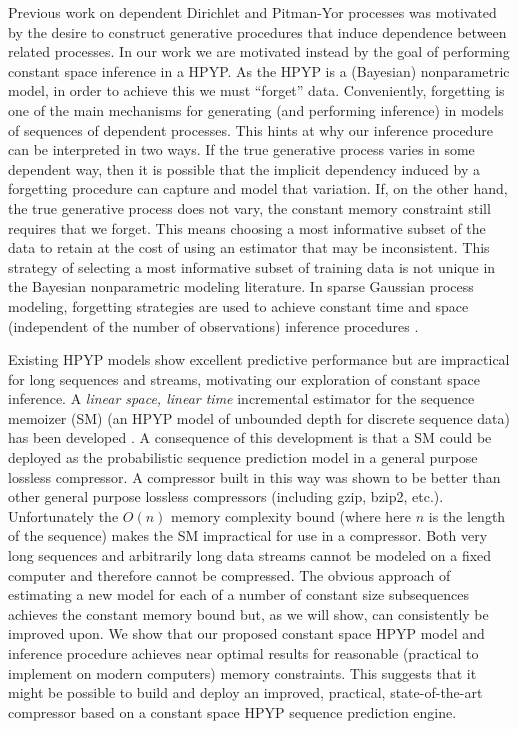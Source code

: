 Previous work on dependent Dirichlet and Pitman-Yor processes \cite{MacEachern2000, Srebro2005, Griffin2006, Caron2007, Caron2007a} was motivated by the desire to construct generative procedures that induce dependence between related processes.  In our work we are motivated instead by the goal of performing constant space inference in a HPYP.  As the HPYP is a (Bayesian) nonparametric model, in order to achieve this we must ``forget'' data.  Conveniently, forgetting is one of the main mechanisms for generating (and performing inference) in models of sequences of dependent processes.  This hints at why our inference procedure can be interpreted in two ways.  If the true generative process varies in some dependent way, then it is possible that the implicit dependency induced by a forgetting procedure can capture and model that variation.  If, on the other hand, the true generative process does not vary, the constant memory constraint still requires that we forget.  This means choosing a  most informative subset of the data to retain at the cost of using an estimator that may be inconsistent.  This strategy of selecting a most informative subset of training data is not unique in the Bayesian nonparametric modeling literature.  In sparse Gaussian process modeling, forgetting strategies are used to achieve constant time and space (independent of the number of observations) inference procedures \cite{ Lawrence2003, Csat'o2002, Snelson2006}.

 
Existing HPYP models show excellent predictive performance but are impractical for long sequences and streams, motivating our exploration of constant space inference.  A  {\em linear space, linear time} incremental estimator for the sequence memoizer (SM) \cite{Wood2009} (an HPYP model of unbounded depth for discrete sequence data) has been developed \cite{Gasthaus2010}.   A consequence of this development is that a SM could be deployed as the probabilistic sequence prediction model in a general purpose lossless compressor.   A compressor built in this way was shown to be better than other general purpose lossless compressors (including gzip, bzip2, etc.).  Unfortunately the $O(n)$ memory complexity bound (where here $n$ is the length of the sequence) makes the SM impractical for use in a compressor.  Both very long sequences and arbitrarily long data streams cannot be modeled on a fixed computer and therefore cannot be compressed.  The obvious approach of estimating a new model for each of a number of constant size subsequences achieves the constant memory bound but, as we will show, can consistently be improved upon.   We show that our proposed constant space HPYP model and inference procedure achieves near optimal results for reasonable (practical to implement on modern computers) memory constraints.  This suggests that it might be possible to build and deploy an improved, practical, state-of-the-art compressor based on a constant space HPYP sequence prediction engine.

